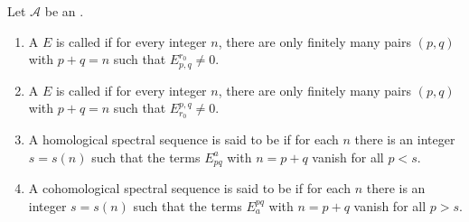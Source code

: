\begin{definition} \label{definition:bounded_homological_cohomological_spectral_sequence}
    Let $\mathcal{A}$ be an .
    \begin{enumerate}
        \item A  $E$ is called  if for every integer $n$, there are only finitely many pairs $(p,q)$ with $p+q=n$ such that $E^{r_0}_{p,q} \neq 0$.


        \item A  $E$ is called  if for every integer $n$, there are only finitely many pairs $(p,q)$ with $p+q=n$ such that $E_{r_0}^{p,q} \neq 0$.


        \item A homological spectral sequence is said to be  if for each $n$ there is an integer $s = s(n)$ such that the terms $E_{pq}^a$ with $n = p+q$ vanish for all $p < s$. 

        \item A cohomological spectral sequence is said to be  if for each $n$ there is an integer $s = s(n)$ such that the terms $E^{pq}_a$ with $n = p+q$ vanish for all $p > s$. 
    \end{enumerate}
\end{definition}